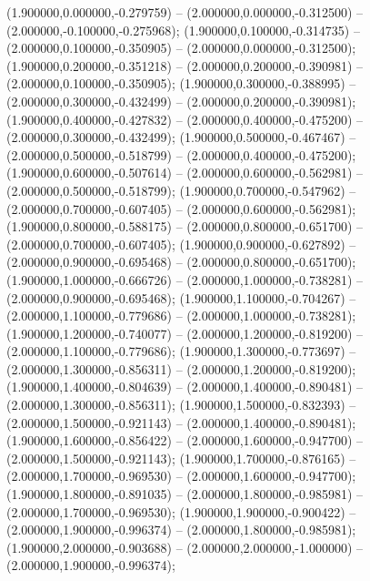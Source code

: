  (1.900000,0.000000,-0.279759) -- (2.000000,0.000000,-0.312500) -- (2.000000,-0.100000,-0.275968);
 (1.900000,0.100000,-0.314735) -- (2.000000,0.100000,-0.350905) -- (2.000000,0.000000,-0.312500);
 (1.900000,0.200000,-0.351218) -- (2.000000,0.200000,-0.390981) -- (2.000000,0.100000,-0.350905);
 (1.900000,0.300000,-0.388995) -- (2.000000,0.300000,-0.432499) -- (2.000000,0.200000,-0.390981);
 (1.900000,0.400000,-0.427832) -- (2.000000,0.400000,-0.475200) -- (2.000000,0.300000,-0.432499);
 (1.900000,0.500000,-0.467467) -- (2.000000,0.500000,-0.518799) -- (2.000000,0.400000,-0.475200);
 (1.900000,0.600000,-0.507614) -- (2.000000,0.600000,-0.562981) -- (2.000000,0.500000,-0.518799);
 (1.900000,0.700000,-0.547962) -- (2.000000,0.700000,-0.607405) -- (2.000000,0.600000,-0.562981);
 (1.900000,0.800000,-0.588175) -- (2.000000,0.800000,-0.651700) -- (2.000000,0.700000,-0.607405);
 (1.900000,0.900000,-0.627892) -- (2.000000,0.900000,-0.695468) -- (2.000000,0.800000,-0.651700);
 (1.900000,1.000000,-0.666726) -- (2.000000,1.000000,-0.738281) -- (2.000000,0.900000,-0.695468);
 (1.900000,1.100000,-0.704267) -- (2.000000,1.100000,-0.779686) -- (2.000000,1.000000,-0.738281);
 (1.900000,1.200000,-0.740077) -- (2.000000,1.200000,-0.819200) -- (2.000000,1.100000,-0.779686);
 (1.900000,1.300000,-0.773697) -- (2.000000,1.300000,-0.856311) -- (2.000000,1.200000,-0.819200);
 (1.900000,1.400000,-0.804639) -- (2.000000,1.400000,-0.890481) -- (2.000000,1.300000,-0.856311);
 (1.900000,1.500000,-0.832393) -- (2.000000,1.500000,-0.921143) -- (2.000000,1.400000,-0.890481);
 (1.900000,1.600000,-0.856422) -- (2.000000,1.600000,-0.947700) -- (2.000000,1.500000,-0.921143);
 (1.900000,1.700000,-0.876165) -- (2.000000,1.700000,-0.969530) -- (2.000000,1.600000,-0.947700);
 (1.900000,1.800000,-0.891035) -- (2.000000,1.800000,-0.985981) -- (2.000000,1.700000,-0.969530);
 (1.900000,1.900000,-0.900422) -- (2.000000,1.900000,-0.996374) -- (2.000000,1.800000,-0.985981);
 (1.900000,2.000000,-0.903688) -- (2.000000,2.000000,-1.000000) -- (2.000000,1.900000,-0.996374);
